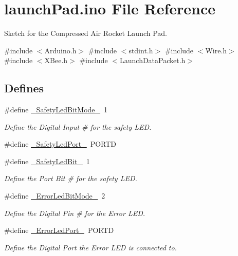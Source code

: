 \hypertarget{launchPad_8ino}{\section{launch\-Pad.\-ino \-File \-Reference}
\label{launchPad_8ino}
}


\-Sketch for the \-Compressed \-Air \-Rocket \-Launch \-Pad.  


{\ttfamily \#include $<$\-Arduino.\-h$>$}\*
{\ttfamily \#include $<$stdint.\-h$>$}\*
{\ttfamily \#include $<$\-Wire.\-h$>$}\*
{\ttfamily \#include $<$\-X\-Bee.\-h$>$}\*
{\ttfamily \#include $<$\-Launch\-Data\-Packet.\-h$>$}\*
\subsection*{\-Defines}
\begin{DoxyCompactItemize}
\item 
\#define \hyperlink{launchPad_8ino_a1a373dcba7ddfc401b86cb5ae2c3d0f6}{\-\_\-\-Safety\-Led\-Bit\-Mode\-\_\-}~1
\begin{DoxyCompactList}\small\item\em \-Define the \-Digital \-Input \# for the safety \-L\-E\-D. \end{DoxyCompactList}\item 
\#define \hyperlink{launchPad_8ino_a5be4de8c40301fb984c38e8aa1c505fe}{\-\_\-\-Safety\-Led\-Port\-\_\-}~\-P\-O\-R\-T\-D
\item 
\#define \hyperlink{launchPad_8ino_a6aeae67497fe7befb28722f8356e5956}{\-\_\-\-Safety\-Led\-Bit\-\_\-}~1
\begin{DoxyCompactList}\small\item\em \-Define the \-Port \-Bit \# for the safety \-L\-E\-D. \end{DoxyCompactList}\item 
\#define \hyperlink{launchPad_8ino_afff5f53ef0f1c562a5dce2243aef6c53}{\-\_\-\-Error\-Led\-Bit\-Mode\-\_\-}~2
\begin{DoxyCompactList}\small\item\em \-Define the \-Digital \-Pin \# for the \-Error \-L\-E\-D. \end{DoxyCompactList}\item 
\#define \hyperlink{launchPad_8ino_affac57d4321e3e0a2ffd81bce3d8ac87}{\-\_\-\-Error\-Led\-Port\-\_\-}~\-P\-O\-R\-T\-D
\begin{DoxyCompactList}\small\item\em \-Define the \-Digital \-Port the \-Error \-L\-E\-D is connected to. \end{DoxyCompactList}\item 

\end{DoxyCompactItemize}
